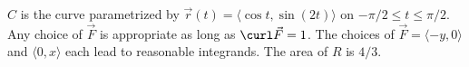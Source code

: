 {$C$ is the curve parametrized by $\vec r(t) = \langle \cos t,\sin (2t)\rangle$ on $-\pi/2\leq t\leq \pi/2$. 
}
{Any choice of $\vec F$ is appropriate as long as $\curl \vec F = 1$. The choices of  $\vec F = \langle -y,0\rangle$ and $\langle 0,x\rangle$ each lead to reasonable integrands. The area of $R$ is $4/3$.
}
